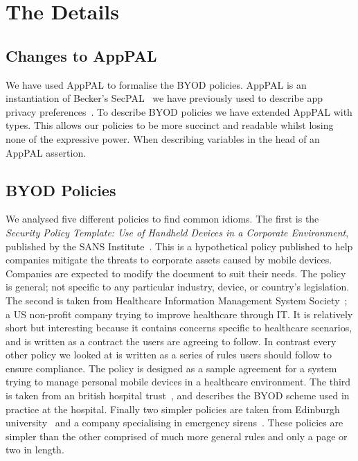 \documentclass{article}
\begin{document}
\section{The Details}
\label{sec:details}

\subsection{Changes to AppPAL}

We have used AppPAL to formalise the BYOD policies.
AppPAL is an instantiation of Becker's SecPAL~\cite{becker_secpal:_2010} we have previously used to describe app privacy preferences~\cite{hallett_apppal_2016}.
To describe BYOD policies we have extended AppPAL with types.
This allows our policies to be more succinct and readable whilst losing none of the expressive power.
When describing variables in the head of an AppPAL assertion.


\subsection{BYOD Policies}

We analysed five different policies to find common idioms.
The first is the \emph{Security Policy Template: Use of Handheld Devices in a Corporate Environment}, published by the SANS Institute~\cite{nicholas_r._c._guerin_security_2008}.
This is a hypothetical policy published to help companies mitigate the threats to corporate assets caused by mobile devices. 
Companies are expected to modify the document to suit their needs.  
The policy is general; not specific to any particular industry, device, or country's legislation.
The second is taken from Healthcare Information Management System Society~\cite{healthcare_information_and_management_systems_society_mobile_2012}; 
  a US non-profit company trying to improve healthcare through IT.  
It is relatively short but interesting because it contains concerns specific to healthcare scenarios, and is written as a contract the users are agreeing to follow. 
In contrast every other policy we looked at is written as a series of rules users should follow to ensure compliance.
The policy is designed as a sample agreement for a system trying to manage personal mobile devices in a healthcare environment.
The third is taken from an british hospital trust~\cite{kennington_mobiles_2014}, and describes the BYOD scheme used in practice at the hospital. 
Finally two simpler policies are taken from Edinburgh university~\cite{david_williamson_bring_2015} and a company specialising in emergency sirens~\cite{code3pse.org_sample_????}. 
These policies are simpler than the other comprised of much more general rules and only a page or two in length.
\end{document}
